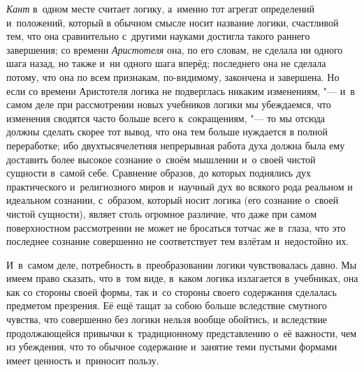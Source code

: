{\em Кант} в~одном месте
считает логику, а~именно тот агрегат определений и~положений, который в
обычном смысле носит название логики, счастливой тем, что она сравнительно
с~другими науками достигла такого раннего завершения; со времени
{\em Аристотеля} она, по его словам, не сделала ни
одного шага назад, но также и~ни одного шага вперёд; последнего она не
сделала потому, что она по всем признакам, по-видимому, закончена и
завершена. Но если со времени Аристотеля логика не подверглась никаким
изменениям, "--- и~в самом деле при рассмотрении новых учебников логики мы
убеждаемся, что изменения сводятся часто больше всего к~сокращениям, "--- то
мы отсюда должны сделать скорее тот вывод, что она тем больше нуждается в
полной переработке; ибо двухтысячелетняя непрерывная работа духа должна
была ему доставить более высокое сознание о~своём мышлении и~о своей чистой
сущности в~самой себе. Сравнение образов, до которых поднялись дух
практического и~религиозного миров и~научный дух во всякого рода реальном и
идеальном сознании, с~образом, который носит логика (его сознание о~своей
чистой сущности), являет столь огромное различие, что даже при самом
поверхностном рассмотрении не может не бросаться тотчас же в~глаза, что это
последнее сознание совершенно не соответствует тем взлётам и~недостойно их.

И~в~самом деле, потребность в~преобразовании логики чувствовалась давно. Мы
имеем право сказать, что в~том виде, в~каком логика излагается в~учебниках,
она как со стороны своей формы, так и~со стороны своего содержания
сделалась предметом презрения. Её ещё тащат за собою больше вследствие
смутного чувства, что совершенно без логики нельзя вообще обойтись, и
вследствие продолжающейся привычки к~традиционному представлению о~её
важности, чем из убеждения, что то обычное содержание и~занятие теми
пустыми формами имеет ценность и~приносит пользу.

